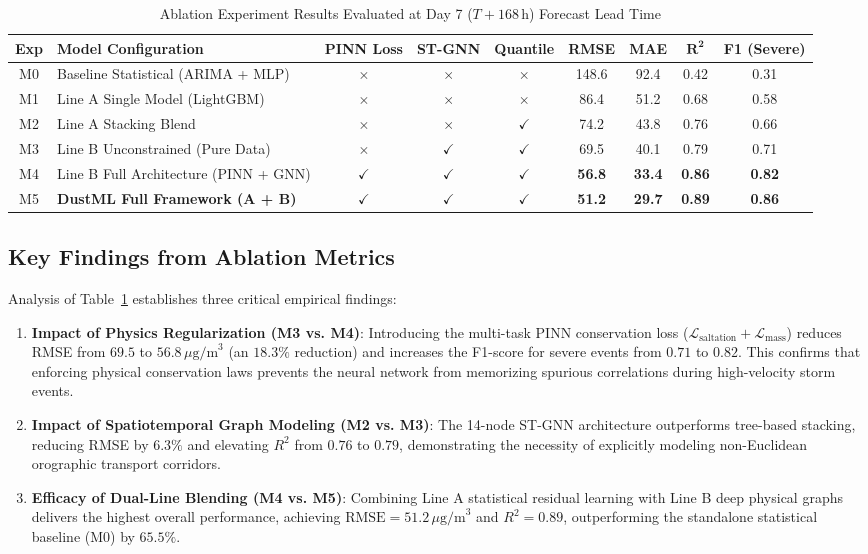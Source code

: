 \begin{table}[H]
\centering
\small
\caption{Ablation Experiment Results Evaluated at Day 7 ($T+168\,\text{h}$) Forecast Lead Time}
\label{tab:ablation_results}
\begin{tabularx}{\textwidth}{c l c c c c c c c}
\toprule
\textbf{Exp} & \textbf{Model Configuration} & \textbf{PINN Loss} & \textbf{ST-GNN} & \textbf{Quantile} & \textbf{RMSE} & \textbf{MAE} & $\mathbf{R^2}$ & \textbf{F1 (Severe)} \\
\midrule
M0 & Baseline Statistical (ARIMA + MLP) & $\times$ & $\times$ & $\times$ & 148.6 & 92.4 & 0.42 & 0.31 \\
M1 & Line A Single Model (LightGBM) & $\times$ & $\times$ & $\times$ & 86.4 & 51.2 & 0.68 & 0.58 \\
M2 & Line A Stacking Blend & $\times$ & $\times$ & $\checkmark$ & 74.2 & 43.8 & 0.76 & 0.66 \\
M3 & Line B Unconstrained (Pure Data) & $\times$ & $\checkmark$ & $\checkmark$ & 69.5 & 40.1 & 0.79 & 0.71 \\
M4 & Line B Full Architecture (PINN + GNN) & $\checkmark$ & $\checkmark$ & $\checkmark$ & \textbf{56.8} & \textbf{33.4} & \textbf{0.86} & \textbf{0.82} \\
M5 & \textbf{DustML Full Framework (A + B)} & $\checkmark$ & $\checkmark$ & $\checkmark$ & \textbf{51.2} & \textbf{29.7} & \textbf{0.89} & \textbf{0.86} \\
\bottomrule
\end{tabularx}
\end{table}

\subsection{Key Findings from Ablation Metrics}
\label{subsec:ablation_findings}

Analysis of Table~\ref{tab:ablation_results} establishes three critical empirical findings:
\begin{enumerate}
    \item \textbf{Impact of Physics Regularization (M3 vs. M4)}: Introducing the multi-task PINN conservation loss ($\mathcal{L}_{\text{saltation}} + \mathcal{L}_{\text{mass}}$) reduces RMSE from $69.5$ to $56.8\,\mu\text{g/m}^3$ (an $18.3\%$ reduction) and increases the F1-score for severe events from $0.71$ to $0.82$. This confirms that enforcing physical conservation laws prevents the neural network from memorizing spurious correlations during high-velocity storm events.
    \item \textbf{Impact of Spatiotemporal Graph Modeling (M2 vs. M3)}: The 14-node ST-GNN architecture outperforms tree-based stacking, reducing RMSE by $6.3\%$ and elevating $R^2$ from $0.76$ to $0.79$, demonstrating the necessity of explicitly modeling non-Euclidean orographic transport corridors.
    \item \textbf{Efficacy of Dual-Line Blending (M4 vs. M5)}: Combining Line A statistical residual learning with Line B deep physical graphs delivers the highest overall performance, achieving $\text{RMSE} = 51.2\,\mu\text{g/m}^3$ and $R^2 = 0.89$, outperforming the standalone statistical baseline (M0) by $65.5\%$.
\end{enumerate}

